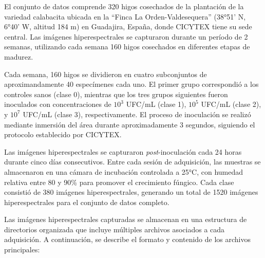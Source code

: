 El conjunto de datos comprende 320 higos cosechados de la plantación de la variedad calabacita ubicada en la ``Finca La Orden-Valdesequera'' (38°51' N, 6°40' W, altitud 184 m) en Guadajira, España, donde CICYTEX tiene su sede central. Las imágenes hiperespectrales se capturaron durante un período de 2 semanas, utilizando cada semana 160 higos cosechados en diferentes etapas de madurez.

\vspace{5mm}

Cada semana, 160 higos se dividieron en cuatro subconjuntos de aproximandamente 40 especímenes cada uno. El primer grupo correspondió a los controles sanos (clase 0), mientras que los tres grupos siguientes fueron inoculados con concentraciones de $10^3$ UFC/mL (clase 1), $10^5$ UFC/mL (clase 2), y $10^7$ UFC/mL (clase 3), respectivamente. El proceso de inoculación se realizó mediante inmersión del área durante aproximadamente 3 segundos, siguiendo el protocolo establecido por CICYTEX.

\vspace{5mm}

Las imágenes hiperespectrales se capturaron \emph{post}-inoculación cada 24 horas durante cinco días consecutivos. Entre cada sesión de adquisición, las muestras se almacenaron en una cámara de incubación controlada a 25°C, con humedad relativa entre 80 y 90\% para promover el crecimiento fúngico. Cada clase consistió de 380 imágenes hiperespectrales, generando un total de 1520 imágenes hiperespectrales para el conjunto de datos completo.

\vspace{5mm}

Las imágenes hiperespectrales capturadas se almacenan en una estructura de directorios organizada que incluye múltiples archivos asociados a cada adquisición. A continuación, se describe el formato y contenido de los archivos principales:

